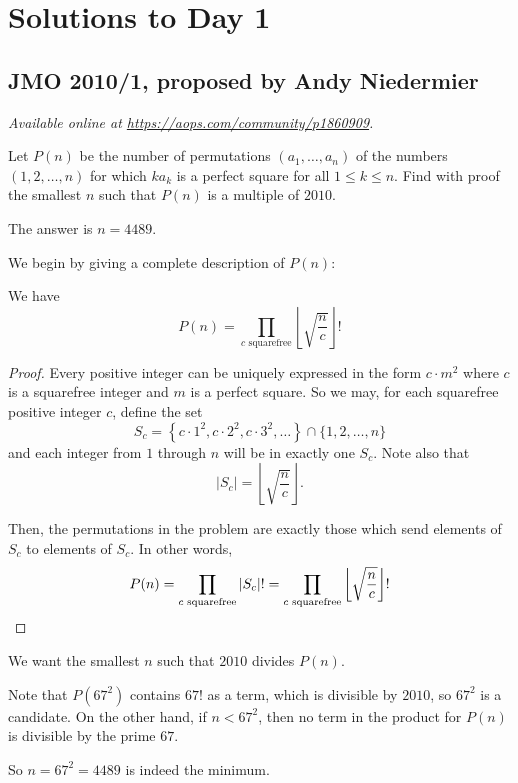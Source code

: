 \documentclass[11pt]{scrartcl}
\begin{document}
\section{Solutions to Day 1}
\subsection{JMO 2010/1, proposed by Andy Niedermier}
\textsl{Available online at \url{https://aops.com/community/p1860909}.}
\begin{mdframed}[style=mdpurplebox,frametitle={Problem statement}]
Let $P(n)$ be the number of permutations $(a_1, \dots, a_n)$
of the numbers $(1, 2, \dots, n)$ for which $ka_k$ is a perfect square
for all $1 \leq k \leq n$.
Find with proof the smallest $n$ such that $P (n)$ is a multiple of $2010$.
\end{mdframed}
The answer is $n= 4489$.

We begin by giving a complete description of $P(n)$:
\begin{claim*}
  We have
  \[ P(n) = \prod_{c \text{ squarefree}} \left\lfloor \sqrt{\frac nc} \right\rfloor! \]
\end{claim*}
\begin{proof}
Every positive integer can be uniquely expressed in the form $c \cdot m^2$
where $c$ is a squarefree integer and $m$ is a perfect square.
So we may, for each squarefree positive integer $c$, define the set
\[ S_c = \left\{ c \cdot 1^2, c \cdot 2^2, c \cdot 3^2, \dots \right\}
  \cap \{1, 2, \dots, n\} \]
and each integer from $1$ through $n$ will be in exactly one $S_c$.
Note also that
\[ \left\lvert S_c \right\rvert = \left\lfloor
  \sqrt{\frac nc} \right\rfloor. \]

Then, the permutations in the problem are exactly
those which send elements of $S_c$ to elements of $S_c$.
In other words,
\[ P(n) = \prod_{c \text{ squarefree}} |S_c|!
  = \prod_{c \text{ squarefree}} \left\lfloor \sqrt{\frac nc} \right\rfloor!
  \qedhere \]
\end{proof}

We want the smallest $n$ such that $2010$ divides $P(n)$.
\begin{itemize}
  \ii Note that $P(67^2)$ contains $67!$ as a term,
  which is divisible by $2010$, so $67^2$ is a candidate.
  \ii On the other hand, if $n < 67^2$,
  then no term in the product for $P(n)$ is divisible by the prime $67$.
\end{itemize}
So $n = 67^2 = 4489$ is indeed the minimum.
\pagebreak
\end{document}
